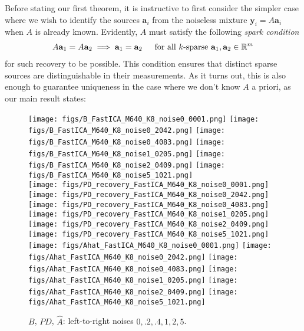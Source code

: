 \documentclass[journal, onecolumn]{IEEEtran}
\begin{document}
Before stating our first theorem, it is instructive to first consider the simpler case where we wish to identify the sources $\mathbf{a}_i$ from the noiseless mixture $\mathbf{y}_i = A\mathbf{a}_i$ when $A$ is already known. Evidently, $A$ must satisfy the following \emph{spark condition}
\begin{align}\label{SparkCondition}
A\mathbf{a}_1 = A\mathbf{a}_2 \implies \mathbf{a}_1 = \mathbf{a}_2 \indent \text{for all $k$-sparse } \mathbf{a}_1, \mathbf{a}_2 \in \mathbb{R}^m
\end{align}
%
for such recovery to be possible. This condition ensures that distinct sparse sources are distinguishable in their measurements. As it turns out, this is also enough to guarantee uniqueness in the case where we don't know $A$ a priori, as our main result states:


\begin{figure*}[t!]
\begin{center}
\texttt{[image: figs/B\_FastICA\_M640\_K8\_noise0\_0001.png]}
\texttt{[image: figs/B\_FastICA\_M640\_K8\_noise0\_2042.png]}
\texttt{[image: figs/B\_FastICA\_M640\_K8\_noise0\_4083.png]}
\texttt{[image: figs/B\_FastICA\_M640\_K8\_noise1\_0205.png]}
\texttt{[image: figs/B\_FastICA\_M640\_K8\_noise2\_0409.png]}
\texttt{[image: figs/B\_FastICA\_M640\_K8\_noise5\_1021.png]}\\
\texttt{[image: figs/PD\_recovery\_FastICA\_M640\_K8\_noise0\_0001.png]}
\texttt{[image: figs/PD\_recovery\_FastICA\_M640\_K8\_noise0\_2042.png]}
\texttt{[image: figs/PD\_recovery\_FastICA\_M640\_K8\_noise0\_4083.png]}
\texttt{[image: figs/PD\_recovery\_FastICA\_M640\_K8\_noise1\_0205.png]}
\texttt{[image: figs/PD\_recovery\_FastICA\_M640\_K8\_noise2\_0409.png]}
\texttt{[image: figs/PD\_recovery\_FastICA\_M640\_K8\_noise5\_1021.png]} \\
\texttt{[image: figs/Ahat\_FastICA\_M640\_K8\_noise0\_0001.png]}
\texttt{[image: figs/Ahat\_FastICA\_M640\_K8\_noise0\_2042.png]}
\texttt{[image: figs/Ahat\_FastICA\_M640\_K8\_noise0\_4083.png]}
\texttt{[image: figs/Ahat\_FastICA\_M640\_K8\_noise1\_0205.png]}
\texttt{[image: figs/Ahat\_FastICA\_M640\_K8\_noise2\_0409.png]}
\texttt{[image: figs/Ahat\_FastICA\_M640\_K8\_noise5\_1021.png]}
\caption{$B$, $PD$, $\hat{A}$: left-to-right noises $0, .2, .4, 1, 2, 5$.}
\end{center}
\end{figure*}
\end{document}
